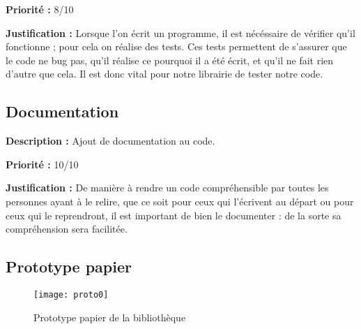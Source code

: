 \begin{titlepage}
{\textbf{Priorité :} 8/10

\textbf{Justification :} Lorsque l'on écrit un programme, il est nécéssaire de vérifier qu'il fonctionne ; pour cela on réalise des tests. Ces tests permettent de s'assurer que le code ne bug pas, qu'il réalise ce pourquoi il a été écrit, et qu'il ne fait rien d'autre que cela. Il est donc vital pour notre librairie de tester notre code.
}

\subsection{Documentation}

{
\textbf{Description :} Ajout de documentation au code.

\textbf{Priorité :} 10/10

\textbf{Justification :} De manière à rendre un code compréhensible par toutes les personnes ayant à le relire, que ce soit pour ceux qui l'écrivent au départ ou pour ceux qui le reprendront, il est important de bien le documenter : de la sorte sa compréhension sera facilitée.
}

\vspace{1cm}
\subsection{Prototype papier}

\begin{figure}[h]
\centering
\texttt{[image: proto0]}
\caption{Prototype papier de la bibliothèque}
\end{figure}


\end{titlepage}
